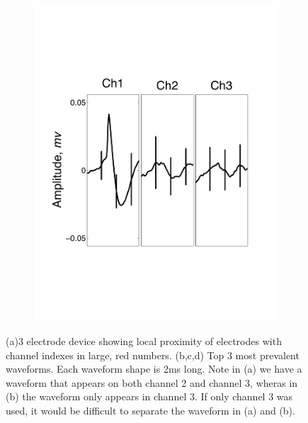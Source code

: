 \begin{center}
\begin{figure}
\begin{subfigure}[b]{.24\textwidth}
\includegraphics[width=\textwidth]{../figs/3devim/clus3}
\caption{}
\label{ex33}
\end{subfigure}
\caption{(a)3 electrode device showing local proximity of electrodes with channel indexes in large, red numbers. (b,c,d) Top 3 most prevalent waveforms.  Each waveform shape is 2ms long.   Note in (a) we have a waveform that appears on both channel 2 and channel 3, wheras in (b) the waveform only appears in channel 3.  If only channel 3 was used, it would be difficult to separate the waveform in (a) and (b).}
\end{figure}
\end{center}
